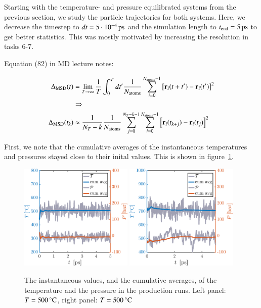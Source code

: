 Starting with the temperature- and pressure equilibrated systems from the previous section, we study the particle trajectories for both systems. Here, we decrease the timestep to   $dt       = \unit[5\cdot 10^{-4}]{ps}$ and the simulation length to $t_{\rm end} = \unit[5]{ps}$ to get better statistics. This was mostly motivated by increasing the resolution in tasks 6-7. 

Equation (82) in MD lecture notes:


\begin{align}
\Delta_{\rm MSD}(t) &= \lim_{T \rightarrow \infty} \frac{1}{T} \int_0^{T} d t' \frac{1}{N_{\rm atoms}} \sum_{i=0}^{N_{\rm atoms}-1} \left[{\bf r}_i(t+t') - {\bf r}_i(t') \right]^2 \\ &\Rightarrow \nonumber
\\
\Delta_{\rm MSD}(t_k) &\approx
\frac{1}{N_T -k}\frac{1}{N_{\rm atoms}} \sum_{j=0}^{N_T-k-1} \sum_{i=0}^{N_{\rm atoms}-1} \left[{\bf r}_i(t_{k+j}) - {\bf r}_i(t_j) \right]^2 
\label{eq:1}
\end{align}


First, we note that the cumulative averages of the instantaneous temperatures and pressures stayed close to their inital values. This is shown in figure~\ref{fig:prod}.

\begin{figure}[!ht]
\begin{center}
  \includegraphics[width=0.48\textwidth]{../figures/TP-prod-500} 
    \includegraphics[width=0.48\textwidth]{../figures/TP-prod-700} 
  \caption{The instantaneous values, and the cumulative averages, of the temperature and the pressure in the production runs. Left panel: $T=\unit[500]{^\circ C}$,  right panel: $T=\unit[500]{^\circ C}$}
  \label{fig:prod}
\end{center}
\end{figure}

